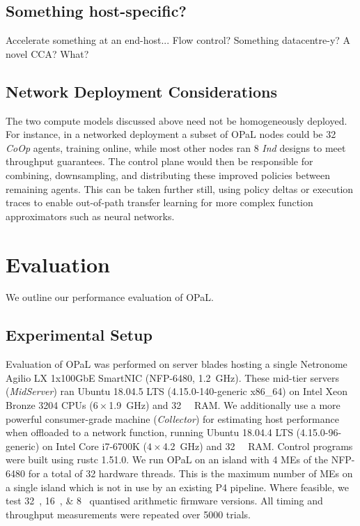 \documentclass[sigconf,natbib=false]{acmart}
\newcommand{\approachshort}{OPaL}
\newcommand{\Coopfw}{CoOp}
\newcommand{\coopfw}{\Coopfw}
\newcommand{\Indfw}{Ind}
\newcommand{\indfw}{\Indfw}
\begin{document}
\subsection{Something host-specific?}\label{sec:integ-2}
Accelerate something at an end-host... Flow control? Something datacentre-y? A novel CCA? What?

\subsection{Network Deployment Considerations}
The two compute models discussed above need not be homogeneously deployed.
For instance, in a networked deployment a subset of \approachshort{} nodes could be \SI{32}{\bit} \emph{\coopfw{}} agents, training online, while most other nodes ran \SI{8}{\bit} \emph{\indfw{}} designs to meet throughput guarantees.
The control plane would then be responsible for combining, downsampling, and distributing these improved policies between remaining agents.
This can be taken further still, using policy deltas or execution traces to enable out-of-path transfer learning for more complex function approximators such as neural networks.

\section{Evaluation}\label{sec:evaluation}
We outline our performance evaluation of \approachshort.

\subsection{Experimental Setup}
Evaluation of \approachshort{} was performed on server blades hosting a single Netronome Agilio LX 1x100GbE SmartNIC (NFP-6480, \SI{1.2}{\giga\hertz}).
These mid-tier servers (\emph{MidServer}) ran Ubuntu 18.04.5 LTS (4.15.0-140-generic x86\_64) on Intel Xeon Bronze 3204 CPUs ($6\times$\SI{1.9}{\giga\hertz}) and \SI{32}{\gibi\byte} RAM.
We additionally use a more powerful consumer-grade machine (\emph{Collector}) for estimating host performance when offloaded to a network function, running Ubuntu 18.04.4 LTS (4.15.0-96-generic) on Intel Core i7-6700K ($4\times$\SI{4.2}{\giga\hertz}) and \SI{32}{\gibi\byte} RAM.
Control programs were built using rustc 1.51.0.
We run \approachshort{} on an island with \num{4} MEs of the NFP-6480 for a total of \num{32} hardware threads.
This is the maximum number of MEs on a single island which is not in use by an existing P4 pipeline.
Where feasible, we test \SIlist{32;16;8}{\bit} quantised arithmetic firmware versions.
All timing and throughput measurements were repeated over \num{5000} trials.
\end{document}
